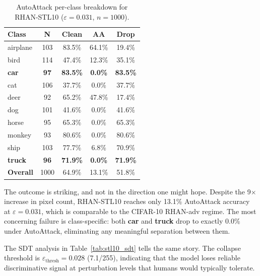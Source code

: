 \documentclass[12pt,a4paper]{article}
\begin{document}
\begin{table}[H]
\centering
\caption{AutoAttack per-class breakdown for RHAN-STL10
($\varepsilon{=}0.031$, $n{=}1000$).}
\label{tab:stl10_aa}
\renewcommand{\arraystretch}{1.25}
\begin{tabularx}{\textwidth}{lCCCC}
\toprule
\textbf{Class} & \textbf{N} & \textbf{Clean} & \textbf{AA} & \textbf{Drop} \\
\midrule
airplane    & 103 & 83.5\% & 64.1\% & 19.4\% \\
bird        & 114 & 47.4\% & 12.3\% & 35.1\% \\
\textbf{car} & \textbf{97} & \textbf{83.5\%} & \textbf{0.0\%} & \textbf{83.5\%} \\
cat         & 106 & 37.7\% & 0.0\%  & 37.7\% \\
deer        & 92  & 65.2\% & 47.8\% & 17.4\% \\
dog         & 101 & 41.6\% & 0.0\%  & 41.6\% \\
horse       & 95  & 65.3\% & 0.0\%  & 65.3\% \\
monkey      & 93  & 80.6\% & 0.0\%  & 80.6\% \\
ship        & 103 & 77.7\% & 6.8\%  & 70.9\% \\
\textbf{truck} & \textbf{96} & \textbf{71.9\%} & \textbf{0.0\%} & \textbf{71.9\%} \\
\midrule
\textbf{Overall} & 1000 & 64.9\% & 13.1\% & 51.8\% \\
\bottomrule
\end{tabularx}
\end{table}

The outcome is striking, and not in the direction one might hope.
Despite the 9$\times$ increase in pixel count, RHAN-STL10 reaches only 13.1\%
AutoAttack accuracy at $\varepsilon{=}0.031$, which is comparable to the CIFAR-10
RHAN-adv regime. The most concerning failure is class-specific: both \textbf{car}
and \textbf{truck} drop to exactly 0.0\% under AutoAttack, eliminating any
meaningful separation between them.

The SDT analysis in Table~\ref{tab:stl10_sdt} tells the same story. The collapse
threshold is $\varepsilon_{\text{thresh}}{=}0.028$ (7.1/255), indicating that the
model loses reliable discriminative signal at perturbation levels that humans
would typically tolerate.
\end{document}

